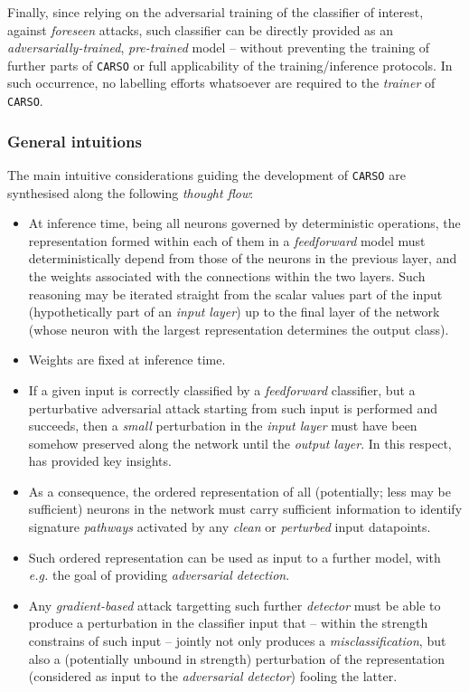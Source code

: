Finally, since relying on the adversarial training of the classifier of interest, against \textit{foreseen} attacks, such classifier can be directly provided as an \textit{adversarially-trained}, \textit{pre-trained} model -- without preventing the training of further parts of \texttt{CARSO} or full applicability of the training/inference protocols. In such occurrence, no labelling efforts whatsoever are required to the \textit{trainer} of \texttt{CARSO}.

\subsubsection{General intuitions}
The main intuitive considerations guiding the development of \texttt{CARSO} are synthesised along the following \textit{thought flow}:
\begin{itemize}
    \item At inference time, being all neurons governed by deterministic operations, the representation formed within each of them in a \textit{feedforward} model must deterministically depend from those of the neurons in the previous layer, and the weights associated with the connections within the two layers. Such reasoning may be iterated straight from the scalar values part of the input (hypothetically part of an \textit{input layer}) up to the final layer of the network (whose neuron with the largest representation determines the output class).
    \item Weights are fixed at inference time.
    \item If a given input is correctly classified by a \textit{feedforward} classifier, but a perturbative adversarial attack starting from such input is performed and succeeds, then a \textit{small} perturbation in the \textit{input layer} must have been somehow preserved along the network until the \textit{output layer}. In this respect, \cite{DoimoEtAl2020Hierarchical} has provided key insights.
    \item As a consequence, the ordered representation of all (potentially; less may be sufficient) neurons in the network must carry sufficient information to identify signature \textit{pathways} activated by any \textit{clean} or \textit{perturbed} input datapoints.
    \item Such ordered representation can be used as input to a further model, with \textit{e.g.} the goal of providing \textit{adversarial detection}.
    \item Any \textit{gradient-based} attack targetting such further \textit{detector} must be able to produce a perturbation in the classifier input that -- within the strength constrains of such input -- jointly not only produces a \textit{misclassification}, but also a (potentially unbound in strength) perturbation of the representation (considered as input to the \textit{adversarial detector}) fooling the latter.

\end{itemize}
